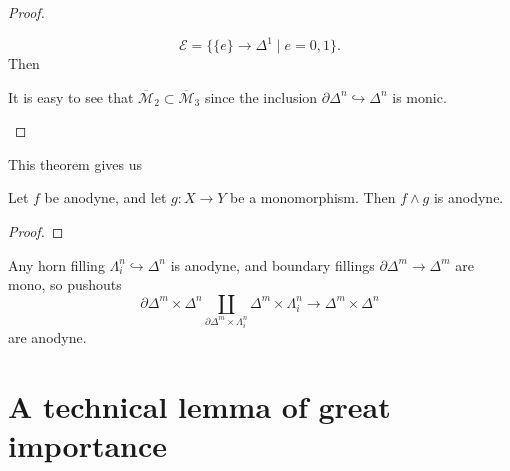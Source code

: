 \documentclass[main.tex]{subfiles}
\begin{document}
\begin{proof}
\begin{enumerate}
      \begin{equation*}
        \mathcal{E} = \{\{e\} \to \Delta^{1} \mid e = 0, 1\}.
      \end{equation*}
      Then

      It is easy to see that $\overline{\mathcal{M}}_{2} \subset \overline{\mathcal{M}}_{3}$ since the inclusion $\partial \Delta^{n} \hookrightarrow \Delta^{n}$ is monic.
  \end{enumerate}

\end{proof}

This theorem gives us

\begin{corollary}
  \label{cor:smash_of_monic_and_anodyne_is_anodyne}
  Let $f$ be anodyne, and let $g\colon X \to Y$ be a monomorphism. Then $f \wedge g$ is anodyne.
\end{corollary}
\begin{proof}

\end{proof}

\begin{example}
  \label{eg:boundary_filling_times_horn_filling_is_anodyne}
  Any horn filling $\Lambda^{n}_{i} \hookrightarrow \Delta^{n}$ is anodyne, and boundary fillings $\partial \Delta^{m} \to \Delta^{m}$ are mono, so pushouts
  \begin{equation*}
    \partial \Delta^{m} \times \Delta^{n} \coprod_{\partial \Delta^{m} \times \Lambda^{n}_{i}} \Delta^{m} \times \Lambda^{n}_{i} \to \Delta^{m} \times \Delta^{n}
  \end{equation*}
  are anodyne.
\end{example}

\section{A technical lemma of great importance}
\label{sec:a_technical_lemma_of_great_importance}
\end{document}
